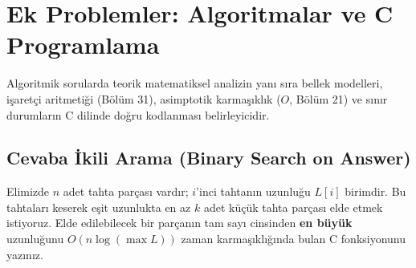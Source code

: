 \section{Ek Problemler: Algoritmalar ve C Programlama}

Algoritmik sorularda teorik matematiksel analizin yanı sıra bellek modelleri, işaretçi aritmetiği (Bölüm 31), asimptotik karmaşıklık ($O$, Bölüm 21) ve sınır durumların C dilinde doğru kodlanması belirleyicidir.

\subsection{Cevaba İkili Arama (Binary Search on Answer)}

\begin{example}
Elimizde $n$ adet tahta parçası vardır; $i$'inci tahtanın uzunluğu $L[i]$ birimdir. Bu tahtaları keserek eşit uzunlukta en az $k$ adet küçük tahta parçası elde etmek istiyoruz. Elde edilebilecek bir parçanın tam sayı cinsinden \textbf{en büyük} uzunluğunu $O(n \log(\max L))$ zaman karmaşıklığında bulan C fonksiyonunu yazınız.
\end{example}

